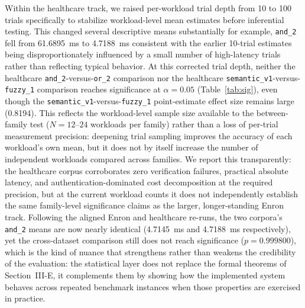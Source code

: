 Within the healthcare track, we raised per-workload trial depth from 10 to 100 trials specifically to stabilize workload-level mean estimates before inferential testing. This changed several descriptive means substantially for example, \texttt{and\_2} fell from 61.6895~ms to 4.7188~ms consistent with the earlier 10-trial estimates being disproportionately influenced by a small number of high-latency trials rather than reflecting typical behavior. At this corrected trial depth, neither the healthcare \texttt{and\_2}-versus-\texttt{or\_2} comparison nor the healthcare \texttt{semantic\_v1}-versus-\texttt{fuzzy\_1} comparison reaches significance at $\alpha=0.05$ (Table~\ref{tab:sig}), even though the \texttt{semantic\_v1}-versus-\texttt{fuzzy\_1} point-estimate effect size remains large (0.8194). This reflects the workload-level sample size available to the between-family test ($N=12$--$24$ workloads per family) rather than a loss of per-trial measurement precision: deepening trial sampling improves the accuracy of each workload's own mean, but it does not by itself increase the number of independent workloads compared across families. We report this transparently: the healthcare corpus corroborates zero verification failures, practical absolute latency, and authentication-dominated cost decomposition at the required precision, but at the current workload counts it does not independently establish the same family-level significance claims as the larger, longer-standing Enron track. Following the aligned Enron and healthcare re-runs, the two corpora's \texttt{and\_2} means are now nearly identical (4.7145~ms and 4.7188~ms respectively), yet the cross-dataset comparison still does not reach significance ($p=0.999800$), which is the kind of nuance that strengthens rather than weakens the credibility of the evaluation: the statistical layer does not replace the formal theorems of Section~III-E, it complements them by showing how the implemented system behaves across repeated benchmark instances when those properties are exercised in practice.
